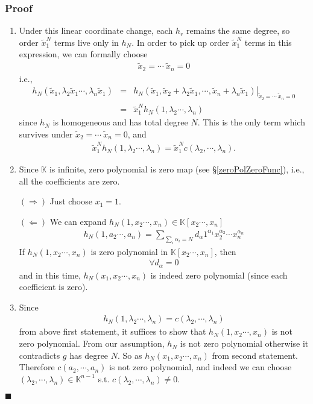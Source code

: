 \documentclass[11pt]{book}
\begin{document}
\subsubsection{Proof}
\begin{enumerate}
\item 
Under this linear coordinate change, each $h_r$ remains the same degree, so order $\tilde{x}_1^{N}$ terms live only in $h_N$.
In order to pick up order $\tilde{x}_1^{N}$ terms in this expression, we can formally choose
\begin{eqnarray}
\tilde{x}_2 = \cdots \ \tilde{x}_{n} = 0
\end{eqnarray}
i.e.,
\begin{eqnarray}
\nonumber
h_N(\tilde{x}_1, \lambda_2 \tilde{x}_1 \cdots, \lambda_n \tilde{x}_1) 
&=& \left. h_N(\tilde{x}_1,\tilde{x}_2 + \lambda_2 \tilde{x}_1, \cdots,  \tilde{x}_n + \lambda_n \tilde{x}_1 ) \right|_{\tilde{x}_2 = \cdots \ \tilde{x}_{n} = 0} \\
&=& \tilde{x}_1^N h_N(1, \lambda_2 \cdots, \lambda_n) 
\end{eqnarray}
since $h_N$ is homogeneous and has total degree $N$.
This is the only term which survives under $\tilde{x}_2 = \cdots \ \tilde{x}_{n} = 0$, and
\begin{eqnarray}
\tilde{x}_1^N h_N(1, \lambda_2 \cdots, \lambda_n) = \tilde{x}_1^N c(\lambda_2, \cdots, \lambda_n).
\end{eqnarray}

\item
Since $\mathbb{K}$ is infinite, zero polynomial is zero map (see \S\ref{zeroPolZeroFunc}), i.e., all the coefficients are zero.

$(\Rightarrow)$ Just choose $x_1 = 1$.

$(\Leftarrow)$
We can expand $h_N(1, x_2 \cdots, x_n) \in \mathbb{K}[x_2 \cdots, x_n]$
\begin{eqnarray}
h_N(1, a_2 \cdots, a_n) =  \sum_{\sum_i \alpha_i = N} d_{\alpha} 1^{\alpha_1} x_2^{\alpha_2} \cdots x_n^{\alpha_n} 
\end{eqnarray}
If $h_N(1, x_2 \cdots, x_n)$ is zero polynomial in $\mathbb{K}[x_2 \cdots, x_n]$, then 
\begin{eqnarray}
\forall d_\alpha = 0
\end{eqnarray}
and in this time, $h_N(x_1, x_2 \cdots, x_n)$ is indeed zero polynomial (since each coefficient is zero).

\item
Since
\begin{eqnarray}
h_N(1, \lambda_2 \cdots, \lambda_n) = c(\lambda_2, \cdots, \lambda_n)
\end{eqnarray}
from above first statement, it suffices to show that $h_N(1, x_2 \cdots, x_n)$ is not zero polynomial.
From our assumption, $h_N$ is not zero polynomial otherwise it contradicts $g$ has degree $N$.
So as $h_N(x_1, x_2 \cdots, x_n)$ from second statement.
Therefore $c(a_2, \cdots, a_n)$ is not zero polynomial, and indeed we can choose $(\lambda_2, \cdots, \lambda_n) \in \mathbb{K}^{n-1}$ s.t. $c(\lambda_2, \cdots, \lambda_n) \neq 0$. 
\end{enumerate}
$\blacksquare$
\end{document}
